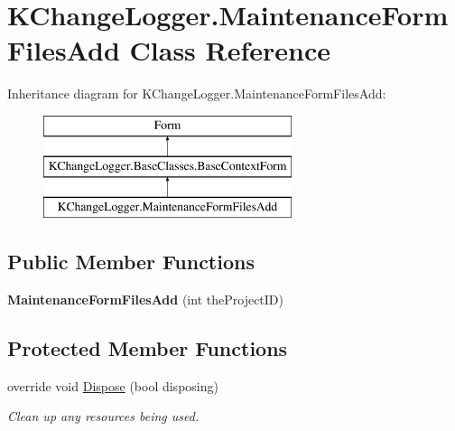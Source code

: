 \hypertarget{class_k_change_logger_1_1_maintenance_form_files_add}{\section{K\-Change\-Logger.\-Maintenance\-Form\-Files\-Add Class Reference}
\label{class_k_change_logger_1_1_maintenance_form_files_add}
}
Inheritance diagram for K\-Change\-Logger.\-Maintenance\-Form\-Files\-Add\-:\begin{figure}[H]
\begin{center}
\leavevmode
\includegraphics[height=3.000000cm]{class_k_change_logger_1_1_maintenance_form_files_add}
\end{center}
\end{figure}
\subsection*{Public Member Functions}
\begin{DoxyCompactItemize}
\item 
\hypertarget{class_k_change_logger_1_1_maintenance_form_files_add_aa2f9c50a4728d39e5e0ff7eb74676752}{{\bfseries Maintenance\-Form\-Files\-Add} (int the\-Project\-I\-D)}\label{class_k_change_logger_1_1_maintenance_form_files_add_aa2f9c50a4728d39e5e0ff7eb74676752}

\end{DoxyCompactItemize}
\subsection*{Protected Member Functions}
\begin{DoxyCompactItemize}
\item 
override void \hyperlink{class_k_change_logger_1_1_maintenance_form_files_add_aa8e1b1e1d7b0fc1a9e3043268cc315e2}{Dispose} (bool disposing)
\begin{DoxyCompactList}\small\item\em Clean up any resources being used. \end{DoxyCompactList}\end{DoxyCompactItemize}
